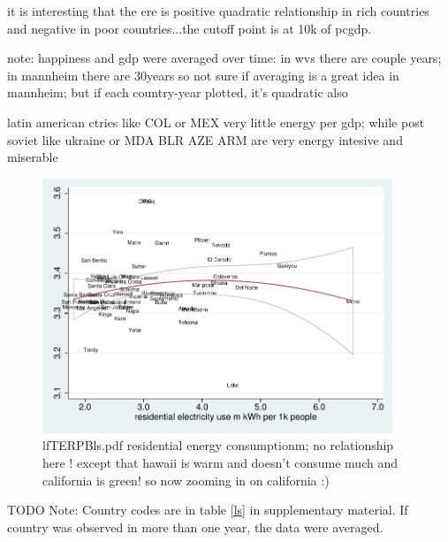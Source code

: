 \documentclass[10pt, letterpaper]{article}
\begin{document}
\begin{spacing}{1.4}
it is interesting that the ere is positive quadratic relationship in rich
countries and negative in poor countries...the cutoff point is at 10k of pcgdp.

note: happiness and gdp were averaged over time: in wvs there are couple years;
in mannheim there are 30years so not sure if averaging is a great idea in
mannheim; but if each country-year plotted, it's quadratic also 


latin american ctries like COL or MEX very little energy per gdp; while post
soviet like ukraine or MDA BLR AZE ARM are very energy intesive and miserable


\begin{figure}[H]
 \includegraphics[height=3in]{graphsAndTables/lfTERPBls.pdf}\centering
\caption{lfTERPBls.pdf residential energy consumptionm; no relationship here !
  except that hawaii is warm and doesn't consume much and california is green!
  so now zooming in on california :)}\label{grComTETPBgdp}
\end{figure}
{\scriptsize TODO Note: Country codes are in table \ref{ls} in supplementary
  material. If country was observed in more than one year, the data were averaged.}



\end{spacing}
\end{document}
